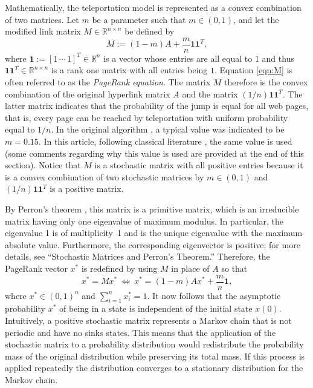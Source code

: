 \documentclass[11pt,draftcls,onecolumn]{IEEEtran}
\newcommand{\field}[1]{{\mathbb{#1}}}
\newcommand{\one}{\mathbf{1}}
\newcommand{\R}{\field{R}}
\begin{document}
Mathematically, the teleportation model is represented as a convex combination of two matrices. 
Let $m$ be a parameter such that $m\in(0,1)$, and let the modified link matrix $M\in \R^{n\times n}$ 
be defined by
\begin{equation}
M := (1-m)A + \frac{m}{n} \one \one^T,
\label{eqn:M}
\end{equation}
where $\one :=[1\,\cdots\,1]^T\in\R^n$ is a vector whose entries are all equal to $1$ 
and thus $\one \one^T \in \R^{n\times n}$ is a rank one matrix with all entries being $1$. 
Equation \eqref{eqn:M} is often referred to as the {\it PageRank equation}. The matrix $M$ therefore 
is the convex combination of the original hyperlink matrix $A$ and the matrix 
$(1/n) \one \one^T$. The latter matrix indicates that the probability of the jump is equal for all web pages, 
that is, every page can be reached by teleportation with uniform probability equal to $1/n$.
In the original algorithm \cite{BriPag:98}, 
a typical value was indicated to be $m=0.15$. 
In this article, following classical literature \cite{LanMey:06},
the same value is used
(some comments regarding why this value is used are provided at the end of this section).
Notice that $M$ is a stochastic matrix with all positive entries
because it is a convex combination of 
two stochastic matrices by $m \in (0,1)$ and $(1/n) \one \one^T$ is a positive matrix.

By Perron's theorem \cite{HorJoh:85}, 
this matrix is a primitive matrix, 
which is an irreducible matrix having only one eigenvalue of maximum modulus.
In particular, the eigenvalue 1 is of multiplicity~1 and 
is the unique eigenvalue with the maximum absolute value. Furthermore,
the corresponding eigenvector is positive; 
for more details, see ``Stochastic Matrices and Perron's Theorem.''
Therefore, the PageRank vector $x^*$ is redefined by using $M$ in place of $A$ so that
\begin{equation}
 x^* = M x^*
   ~\Leftrightarrow~ 
   x^* = (1-m)A x^* + \frac{m}{n}\one,
\label{eqn:prvec}
\end{equation}
where $x^*\in (0,1)^n$ and $\sum_{i=1}^n x^*_i = 1$. 
It now follows that the asymptotic probability $x^*$ of being in a state is independent of the 
initial state $x(0)$. Intuitively, a positive stochastic matrix represents 
a Markov chain that is not periodic and have no sinks states.
This means that the application of the stochastic matrix to a probability 
distribution would redistribute the probability mass of the original distribution 
while preserving its total mass. If this process is applied repeatedly the distribution converges 
to a stationary distribution for the Markov chain.
\end{document}
